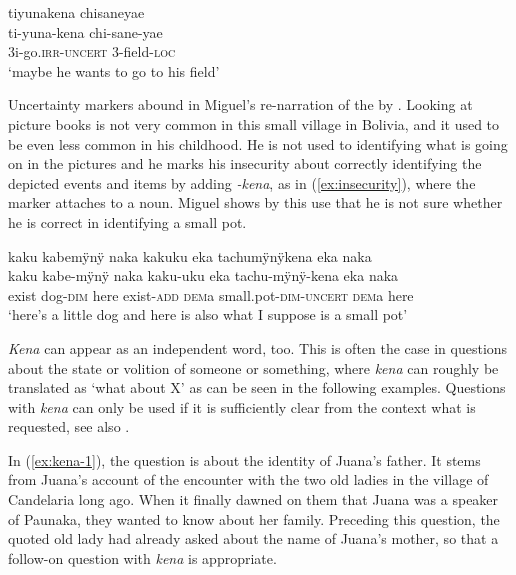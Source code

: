 \ea\label{ex:SPEC-2}
\begingl 
\glpreamble tiyunakena chisaneyae\\
\gla ti-yuna-kena chi-sane-yae\\ 
\glb 3i-go.\textsc{irr}-\textsc{uncert} 3-field-\textsc{loc}\\ 
\glft ‘maybe he wants to go to his field’\\ 
\endgl
\trailingcitation{[rxx-e120511l.348]}
\xe

Uncertainty markers abound in Miguel’s re-narration of the  by \citet[]{Mayer2003}. Looking at picture books is not very common in this small village in Bolivia, and it used to be even less common in his childhood. He is not used to identifying what is going on in the pictures and he marks his insecurity about correctly identifying the depicted events and items by adding \textit{-kena}, as in (\ref{ex:insecurity}), where the marker attaches to a noun. Miguel shows by this use that he is not sure whether he is correct in identifying a small pot.

\ea\label{ex:insecurity}
\begingl 
\glpreamble kaku kabemÿnÿ naka kakuku eka tachumÿnÿkena eka naka\\
\gla kaku kabe-mÿnÿ naka kaku-uku eka tachu-mÿnÿ-kena eka naka\\ 
\glb exist dog-\textsc{dim} here exist-\textsc{add} \textsc{dem}a small.pot-\textsc{dim}-\textsc{uncert} \textsc{dem}a here\\ 
\glft ‘here’s a little dog and here is also what I suppose is a small pot’\\ 
\endgl
\trailingcitation{[mox-a110920l-2.007]}
\xe

\textit{Kena} can appear as an independent word, too. This is often the case in questions about the state or volition of someone or something, where \textit{kena} can roughly be translated as ‘what about X’ as can be seen in the following examples. Questions with \textit{kena} can only be used if it is sufficiently clear from the context what is requested, see also .

In (\ref{ex:kena-1}), the question is about the identity of Juana’s father. It stems from Juana’s account of the encounter with the two old ladies in the village of Candelaria long ago. When it finally dawned on them that Juana was a speaker of Paunaka, they wanted to know about her family. Preceding this question, the quoted old lady had already asked about the name of Juana’s mother, so that a follow-on question with \textit{kena} is appropriate. %


